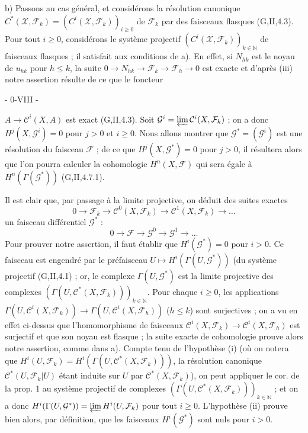 b) Passons au cas général, et considérons la résolution canonique $C^*(\mathcal{X}, \mathcal{F}_k) = (C^i(\mathcal{X}, \mathcal{F}_k))_{i \ge 0}$ de $\mathcal{F}_k$ par des faisceaux flasques (G,II,4.3). Pour tout $i \ge 0$, considérons le système projectif $(C^i(\mathcal{X}, \mathcal{F}_k))_{k \in \mathbb{N}}$ de faisceaux flasques ; il satisfait aux conditions de a). En effet, si $N_{hk}$ est le noyau de $u_{hk}$ pour $h \le k$, la suite $0 \to N_{hk} \to \mathcal{F}_k \to \mathcal{F}_h \to 0$ est exacte et d'après (iii) notre assertion résulte de ce que le foncteur 

\newpage


- 0-VIII -

$A \to \mathcal{C}^i(X, A)$ est exact (G,II,4.3). Soit $\mathcal{G}^i = \varprojlim \mathcal{C}^i(X, \mathcal{F}_k)$ ; on a donc $H^j(X, \mathcal{G}^i) = 0$ pour $j > 0$ et $i \ge 0$. Nous allons montrer que $\mathcal{G}^* = (\mathcal{G}^i)$ est une résolution du faisceau $\mathcal{F}$ ; de ce que $H^j(X, \mathcal{G}^*) = 0$ pour $j > 0$, il résultera alors que l'on pourra calculer la cohomologie $H^n(X, \mathcal{F})$ qui sera égale à $H^n(\Gamma(\mathcal{G}^*))$ (G,II,4.7.1).

Il est clair que, par passage à la limite projective, on déduit des suites exactes
$$ 0 \to \mathcal{F}_k \to \mathcal{C}^0(X, \mathcal{F}_k) \to \mathcal{C}^1(X, \mathcal{F}_k) \to \dots $$
un faisceau différentiel $\mathcal{G}^*$ :
$$ 0 \to \mathcal{F} \to \mathcal{G}^0 \to \mathcal{G}^1 \to \dots $$
Pour prouver notre assertion, il faut établir que $H^i(\mathcal{G}^*) = 0$ pour $i > 0$. Ce faisceau est engendré par le préfaisceau $U \mapsto H^i(\Gamma(U, \mathcal{G}^*))$ (du système projectif (G,II,4.1) ; or, le complexe $\Gamma(U, \mathcal{G}^*)$ est la limite projective des complexes $(\Gamma(U, \mathcal{C}^*(X, \mathcal{F}_k)))_{k \in \mathbb{N}}$. Pour chaque $i \ge 0$, les applications $\Gamma(U, \mathcal{C}^i(X, \mathcal{F}_k)) \to \Gamma(U, \mathcal{C}^i(X, \mathcal{F}_h))$ ($h \le k$) sont surjectives ; on a vu en effet ci-dessus que l'homomorphisme de faisceaux $\mathcal{C}^i(X, \mathcal{F}_k) \to \mathcal{C}^i(X, \mathcal{F}_h)$ est surjectif et que son noyau est flasque ; la suite exacte de cohomologie prouve alors notre assertion, comme dans a). Compte tenu de l'hypothèse (i) (où on notera que $H^i(U, \mathcal{F}_k) = H^i(\Gamma(U, \mathcal{C}^*(X, \mathcal{F}_k)))$, la résolution canonique $\mathcal{C}^*(U, \mathcal{F}_k|U)$ étant induite sur $U$ par $\mathcal{C}^*(X, \mathcal{F}_k)$), on peut appliquer le cor. de la prop. 1 au système projectif de complexes $(\Gamma(U, \mathcal{C}^*(X, \mathcal{F}_k)))_{k \in \mathbb{N}}$ ; et on a donc $H^i(\Gamma(U, \mathcal{G}^*)) = \varprojlim H^i(U, \mathcal{F}_k)$ pour tout $i \ge 0$. L'hypothèse (ii) prouve bien alors, par définition, que les faisceaux $H^i(\mathcal{G}^*)$ sont nuls pour $i > 0$.

